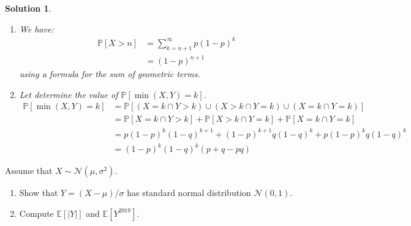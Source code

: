 \documentclass{article}
\newcommand{\proba}[1]{\mathbb{P}[#1]}
\newtheorem{solution}{Solution}
\begin{document}
\begin{solution}
  \begin{enumerate}
    \item We have:
          \begin{align*}
            \proba{X > n} & = \sum_{k = n+1}^\infty p {(1-p)}^k \\
                          & = {(1-p)}^{n+1}
          \end{align*}
          using a formula for the sum of geometric terms.
    \item Let determine the value of $\proba{\min(X, Y) = k}$.
          \begin{align*}
            \proba{\min(X, Y) = k} & = \proba{(X = k \cap Y > k) \cup (X > k \cap Y = k) \cup (X = k \cap Y = k)}          \\
                                   & = \proba{X = k \cap Y > k} + \proba{X > k \cap Y = k} + \proba{X = k \cap Y = k}      \\
                                   & = p {(1-p)}^k {(1-q)}^{k+1} + {(1-p)}^{k+1} q {(1-q)}^{k} + p {(1-p)}^k q {(1-q)}^{k} \\
                                   & = {(1-p)}^k {(1-q)}^k (p + q - pq)
          \end{align*}
  \end{enumerate}
\end{solution}

\begin{Exercise} Assume that $X \sim \mathcal{N}\left(\mu, \sigma^{2}\right)$.
  \begin{enumerate}
    \item Show that $Y=(X-\mu) / \sigma$ has standard normal distribution
          $\mathcal{N}(0,1)$.
    \item Compute $\mathbb{E}[|Y|]$ and $\mathbb{E}\left[Y^{2019}\right]$.
  \end{enumerate}
\end{Exercise}
\end{document}
